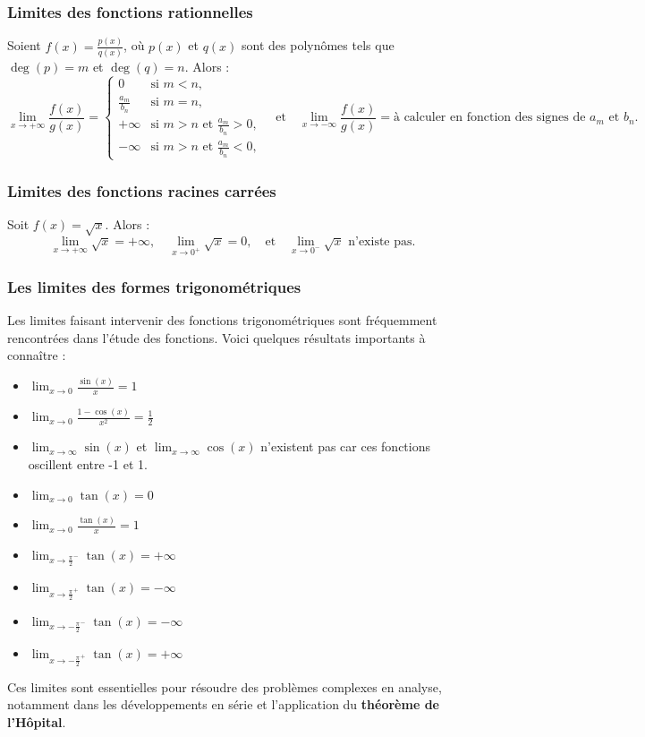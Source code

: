 \documentclass{article}
\begin{document}
\subsubsection{Limites des fonctions rationnelles}
Soient \( f(x) = \frac{p(x)}{q(x)} \), où \( p(x) \) et \( q(x) \) sont des polynômes tels que \( \deg(p) = m \) et \( \deg(q) = n \). Alors :
\[
\lim_{x \to +\infty} \frac{f(x)}{g(x)} =
\begin{cases} 
	0 & \text{si } m < n, \\
	\frac{a_m}{b_n} & \text{si } m = n, \\
	+ \infty & \text{si } m > n \text{ et } \frac{a_m}{b_n} > 0, \\
	- \infty & \text{si } m > n \text{ et } \frac{a_m}{b_n} < 0,
\end{cases}
\quad \text{et} \quad
\lim_{x \to -\infty} \frac{f(x)}{g(x)} = \text{à calculer en fonction des signes de } a_m \text{ et } b_n.
\]

\subsubsection{Limites des fonctions racines carrées}
Soit \( f(x) = \sqrt{x} \). Alors :
\[
\lim_{x \to +\infty} \sqrt{x} = +\infty,
\quad \lim_{x \to 0^+} \sqrt{x} = 0,
\quad \text{et} \quad \lim_{x \to 0^-} \sqrt{x} \text{ n'existe pas}.
\]



\subsubsection{Les limites des formes trigonométriques}

Les limites faisant intervenir des fonctions trigonométriques sont fréquemment rencontrées dans l'étude des fonctions. Voici quelques résultats importants à connaître :

\begin{itemize}
	\item $\lim_{x \to 0} \frac{\sin(x)}{x} = 1$
	\item $\lim_{x \to 0} \frac{1 - \cos(x)}{x^2} = \frac{1}{2}$
	\item $\lim_{x \to \infty} \sin(x)$ et $\lim_{x \to \infty} \cos(x)$ n'existent pas car ces fonctions oscillent entre -1 et 1.
	\item $\lim_{x \to 0} \tan(x) = 0$
	\item $\lim_{x \to 0} \frac{\tan(x)}{x} = 1$
	\item $\lim_{x \to \frac{\pi}{2}^-} \tan(x) = +\infty$
	\item $\lim_{x \to \frac{\pi}{2}^+} \tan(x) = -\infty$
	\item $\lim_{x \to -\frac{\pi}{2}^-} \tan(x) = -\infty$
	\item $\lim_{x \to -\frac{\pi}{2}^+} \tan(x) = +\infty$
\end{itemize}

Ces limites sont essentielles pour résoudre des problèmes complexes en analyse, notamment dans les développements en série et l'application du\textbf{ théorème de l'Hôpital}.


	

	

	
\end{document}

